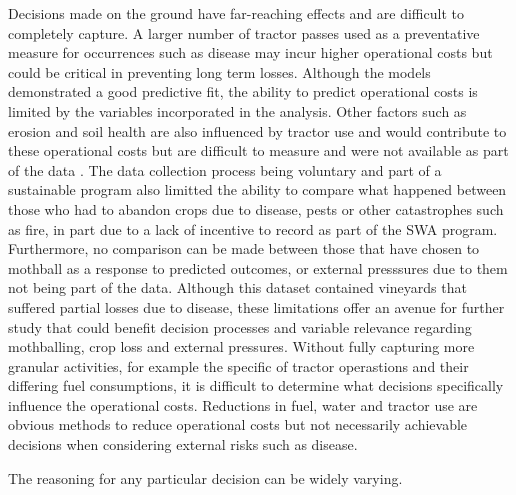 \documentclass[review,12pt,authoryear]{elsarticle}
\begin{document}
\begin{linenumbers}
Decisions made on the ground have far-reaching effects and are difficult to completely capture. A larger number of tractor passes used as a preventative measure for occurrences such as disease may incur higher operational costs but could be critical in preventing long term losses. Although the models demonstrated a good predictive fit, the ability to predict operational costs is limited by the variables incorporated in the analysis. Other factors such as erosion and soil health are also influenced by tractor use and would contribute to these operational costs but are difficult to measure and were not available as part of the data \citep{capelloEffectsTractorPasses2019,capelloPermanentCoverSoil2020}. The data collection process being voluntary and part of a sustainable program also limitted the ability to compare what happened between those who had to abandon crops due to disease, pests or other catastrophes such as fire, in part due to a lack of incentive to record as part of the SWA program. Furthermore, no comparison can be made between those that have chosen to mothball as a response to predicted outcomes, or external presssures due to them not being part of the data. Although this dataset contained vineyards that suffered partial losses due to disease, these limitations offer an avenue for further study that could benefit decision processes and variable relevance regarding mothballing, crop loss and external pressures. Without fully capturing more granular activities, for example the specific of tractor operastions and their differing fuel consumptions, it is difficult to determine what decisions specifically influence the operational costs. Reductions in fuel, water and tractor use are obvious methods to reduce operational costs but not necessarily achievable decisions when considering external risks such as disease.
\par
The reasoning for any particular decision can be widely varying. 

\end{linenumbers}
\end{document}
